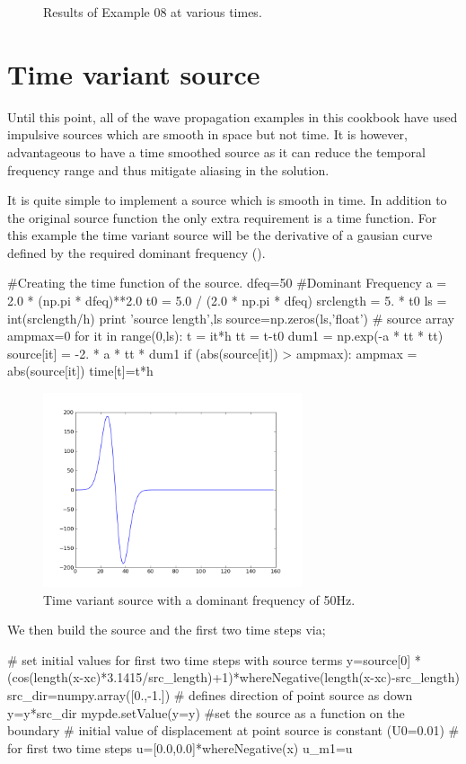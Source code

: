 \begin{figure}[htp]
{\label{fig:ex08pw950}
}
\label{fig:ex08pw}
\caption{Results of Example 08 at various times.}
\end{figure}
\clearpage

\section{Time variant source}

Until this point, all of the wave propagation examples in this cookbook have
used impulsive sources which are smooth in space but not time. It is however,
advantageous to have a time smoothed source as it can reduce the temporal
frequency range and thus mitigate aliasing in the solution. 

It is quite 
simple to implement a source which is smooth in time. In addition to the
original source function the only extra requirement is a time function. For
this example the time variant source will be the derivative of a gausian curve
defined by the required dominant frequency ().
\begin{python}
#Creating the time function of the source.
dfeq=50 #Dominant Frequency
a = 2.0 * (np.pi * dfeq)**2.0
t0 = 5.0 / (2.0 * np.pi * dfeq)
srclength = 5. * t0
ls = int(srclength/h)
print 'source length',ls
source=np.zeros(ls,'float') # source array
ampmax=0
for it in range(0,ls):
    t = it*h
    tt = t-t0
    dum1 = np.exp(-a * tt * tt)
    source[it] = -2. * a * tt * dum1
    if (abs(source[it]) > ampmax):
        ampmax = abs(source[it])
    time[t]=t*h
\end{python}
\begin{figure}[ht]
\centering
\includegraphics[width=3in]{figures/source.png}
\caption{Time variant source with a dominant frequency of 50Hz.}
\label{fig:tvsource}
\end{figure}

We then build the source and the first two time steps via;
\begin{python}
# set initial values for first two time steps with source terms
y=source[0]
*(cos(length(x-xc)*3.1415/src_length)+1)*whereNegative(length(x-xc)-src_length)
src_dir=numpy.array([0.,-1.]) # defines direction of point source as down
y=y*src_dir
mypde.setValue(y=y) #set the source as a function on the boundary
# initial value of displacement at point source is constant (U0=0.01)
# for first two time steps
u=[0.0,0.0]*whereNegative(x)
u_m1=u
\end{python}

